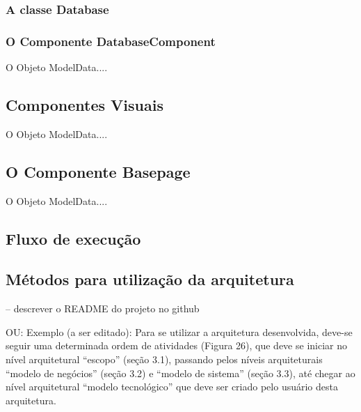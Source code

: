 \subsubsection{A classe Database}\label{sec:solucao-desenvolvida}
\subsubsection{O Componente DatabaseComponent}\label{sec:solucao-desenvolvida}
O Objeto ModelData....


\subsection{Componentes Visuais}\label{sec:solucao-desenvolvida}
O Objeto ModelData....


\subsection{O Componente Basepage}\label{sec:solucao-desenvolvida}
O Objeto ModelData....


\subsection{Fluxo de execução}\label{sec:solucao-desenvolvida}


\subsection{Métodos para utilização da arquitetura}
-- descrever o README do projeto no github

OU:
Exemplo (a ser editado): Para se utilizar a arquitetura desenvolvida, deve-se seguir uma determinada ordem de atividades (Figura 26), que deve se iniciar no nível arquitetural “escopo” (seção 3.1), passando pelos níveis arquiteturais “modelo de negócios” (seção 3.2) e “modelo de sistema” (seção 3.3), até chegar ao nível arquitetural “modelo tecnológico” que deve ser criado pelo usuário desta arquitetura.